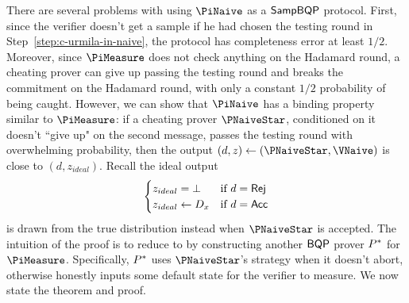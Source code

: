 There are several problems with using $\PiNaive$ as a $\operatorname{\mathsf{SampBQP}}$ protocol. First, since the verifier doesn't get a sample if he had chosen the testing round in Step~\ref{step:c-urmila-in-naive}, the protocol has completeness error at least $1/2$. Moreover, since $\PiMeasure$ does not check anything on the Hadamard round, a cheating prover can give up passing the testing round and breaks the commitment on the Hadamard round, with only a constant $1/2$ probability of being caught.
However, we can show that $\PiNaive$ has a binding property similar to $\PiMeasure$:
if a cheating prover $\PNaiveStar$, conditioned on it doesn't ``give up" on the second message, passes the testing round with overwhelming probability,
then the output $(d, z)\leftarrow(\PNaiveStar, \VNaive)$ is close to $(d, z_{ideal})$.
Recall the ideal output
$$\begin{cases}
	z_{ideal}=\bot & \text{if } d=\mathsf{Rej}\\
	z_{ideal}\leftarrow D_x & \text{if } d=\mathsf{Acc}
\end{cases}$$
is drawn from the true distribution instead when $\PNaiveStar$ is accepted.
The intuition of the proof is to reduce to  by constructing another $\operatorname{\mathsf{BQP}}$ prover $P^*$ for $\PiMeasure$.
Specifically, $P^*$ uses $\PNaiveStar$'s strategy when it doesn't abort, otherwise honestly inputs some default state for the verifier to measure.
We now state the theorem and proof.

